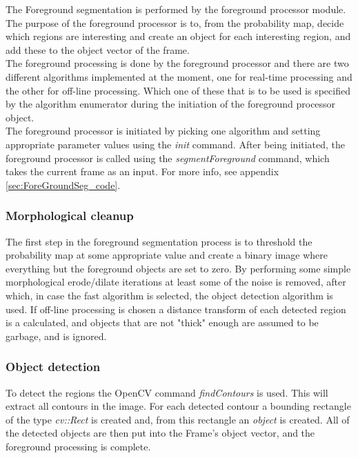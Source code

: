 The Foreground segmentation is performed by the foreground processor module. The purpose of the foreground processor is to, 
from the probability map, decide which regions are interesting and create an object for each interesting region, and add 
these to the object vector of the frame. \\
\newline
The foreground processing is done by the foreground processor and there are two different algorithms implemented at the 
moment, one for real-time processing and the other for off-line processing. Which one of these that is to be used is 
specified by the algorithm enumerator during the initiation of the foreground processor object. \\
\newline
The foreground processor is initiated by picking one algorithm and setting appropriate parameter values using the 
\emph{init} command. After being initiated, the foreground processor is called using the \emph{segmentForeground} 
command, which takes the current frame as an input. For more info, see appendix \ref{sec:ForeGroundSeg_code}.

\subsubsection{Morphological cleanup}
The first step in the foreground segmentation process is to threshold the probability map at some appropriate value 
and create a binary image where everything but the foreground objects are set to zero. By performing some simple 
morphological erode/dilate iterations at least some of the noise is removed, after which, in case the fast algorithm 
is selected, the object detection algorithm is used. If off-line processing is chosen a distance transform of each 
detected region is a calculated, and objects that are not "thick" enough are assumed to be garbage, and is ignored.


\subsubsection{Object detection}
To detect the regions the OpenCV command \emph{findContours} is used. This will extract all contours in the image. 
For each detected contour a bounding rectangle of the type \emph{cv::Rect} is created and, from this rectangle an 
\emph{object} is created. All of the detected objects are then put into the Frame's object vector, 
and the foreground processing is complete.